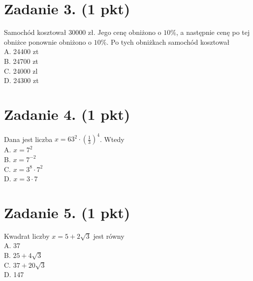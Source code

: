 \documentclass[10pt]{article}
\begin{document}
\section*{Zadanie 3. (1 pkt)}
Samochód kosztował 30000 zł. Jego cenę obniżono o \(10 \%\), a następnie cenę po tej obniżce ponownie obniżono o \(10 \%\). Po tych obniżkach samochód kosztował\\
A. 24400 zt\\
B. 24700 zt\\
C. 24000 zl\\
D. 24300 zt

\section*{Zadanie 4. (1 pkt)}
Dana jest liczba \(x=63^{2} \cdot\left(\frac{1}{3}\right)^{4}\). Wtedy\\
A. \(x=7^{2}\)\\
B. \(x=7^{-2}\)\\
C. \(x=3^{8} \cdot 7^{2}\)\\
D. \(x=3 \cdot 7\)

\section*{Zadanie 5. (1 pkt)}
Kwadrat liczby \(x=5+2 \sqrt{3}\) jest równy\\
A. 37\\
B. \(25+4 \sqrt{3}\)\\
C. \(37+20 \sqrt{3}\)\\
D. 147
\end{document}
